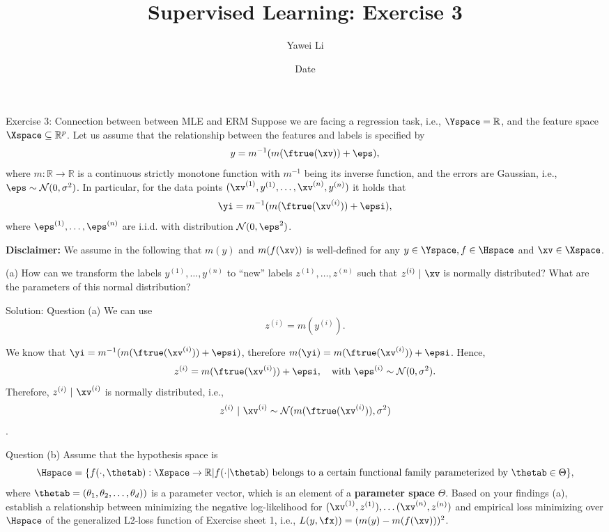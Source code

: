 \documentclass[aspectratio=169]{beamer}
\title[]{\textbf{Supervised Learning: Exercise 3}}
\author{Yawei Li}
\institute[LMU]
{
\\
  \texttt{yawei.li@stat.uni-muenchen.de}
}
\date{Date}
\newcommand{\my}{m(y)}
\newcommand{\myi}{m(\yi)}
\newcommand{\mfx}{m(f(\xv))}
\newcommand{\zi}{z^{(i)}}
\newcommand{\mfruexi}{m(\ftrue(\xv^{(i)}))}
\begin{document}
\begin{frame}
\titlepage

\end{frame}


\begin{frame}{Exercise 3: Connection between between MLE and ERM}
\small
	Suppose we are facing a regression task, i.e., $\Yspace = \mathbb{R}$, and the feature space $\Xspace \subseteq \mathbb{R}^p$. Let us assume that the relationship between the features and labels is specified by 
	$$y = m^{-1}(m(\ftrue(\xv)) + \eps),$$
	where $m: \mathbb{R} \to \mathbb{R}$ is a continuous strictly monotone function with $m^{-1}$ being its inverse function, and the errors are Gaussian, i.e., $\eps \sim \mathcal{N}(0, \sigma^2)$. In particular, for the data points $(\xv^{(1)}, y^{(1)}, \ldots, \xv^{(n)}, y^{(n)})$ it holds that
	$$\yi = m^{-1}(m(\ftrue(\xv^{(i)})) + \epsi),$$
	where $\eps^{(1)}, \ldots, \eps^{(n)}$ are i.i.d. with distribution $\mathcal{N}(0, \eps^2)$.
	
	\textbf{Disclaimer:} We assume in the following that $\my$ and $\mfx$ is well-defined for any $y \in \Yspace, f \in \Hspace$ and $\xv \in \Xspace$.
	
	(a) How can we transform the labels $y^{(1)}, \ldots, y^{(n)}$ to ``new'' labels $z^{(1)}, \ldots, z^{(n)}$ such that $ z^{(i)} \ | \ \xv$ is normally distributed? What are the parameters of this normal distribution?
	
\end{frame}

\begin{frame}{Solution: Question (a)}
	We can use 
	$$z^{(i)} = m(y^{(i)}).$$

	We know that $ \yi = m^{-1}(\mfruexi + \epsi)$, therefore $	\myi = \mfruexi + \epsi$.
	Hence, 
	$$\zi = \mfruexi + \epsi, \quad \text{with } \eps^{(i)} \sim \mathcal{N}(0, \sigma^2). $$
	Therefore, $\zi \ | \ \xv^{(i)}$ is normally distributed, i.e., $$\zi \ | \ \xv^{(i)} \sim  \mathcal{N}(\mfruexi, \sigma^2)$$.

\end{frame}

\begin{frame}{Question (b)}
	Assume that the hypothesis space is 
	$$\Hspace = \{ f(\cdot, \thetab): \Xspace \to \mathbb{R} | f(\cdot | \thetab) \text{ belongs to a certain functional family parameterized by } \thetab \in \Theta \},$$
	where $\thetab = (\theta_1, \theta_2, \ldots, \theta_d))$ is a parameter vector, which is an element of a \textbf{parameter space} $\Theta$. Based on your findings (a), establish a relationship between minimizing the negative log-likelihood for $(\xv^{(1)}, z^{(1)}), 
	\ldots (\xv^{(n)}, z^{(n)})$ and empirical loss minimizing over $\Hspace$ of the generalized L2-loss function of Exercise sheet 1, i.e., $L(y, \fx)) = (\my - \mfx)^2$.
\end{frame}
\end{document}
